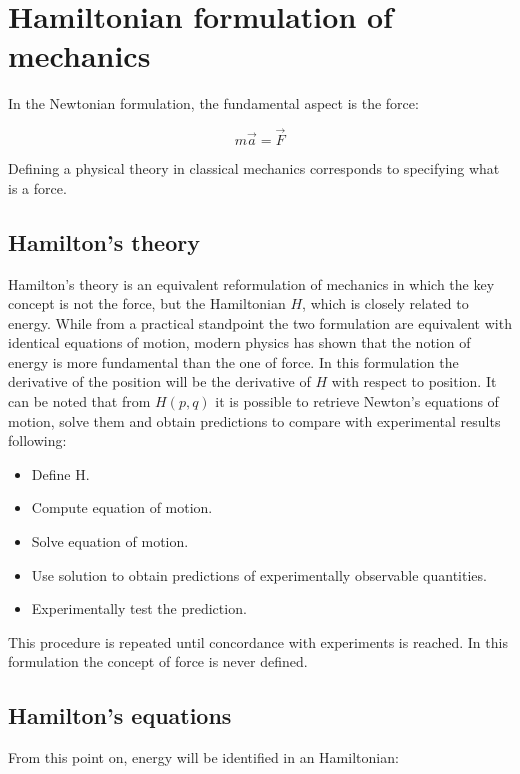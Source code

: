 \section{Hamiltonian formulation of mechanics}
In the Newtonian formulation, the fundamental aspect is the force:

$$m \vec{a} = \vec{F}$$

Defining a physical theory in classical mechanics corresponds to specifying what is a force.

  \subsection{Hamilton's theory}
  Hamilton's theory is an equivalent reformulation of mechanics in which the key concept is not the force, but the Hamiltonian $H$, which is closely related to energy.
  While from a practical standpoint the two formulation are equivalent with identical equations of motion, modern physics has shown that the notion of energy is more fundamental than the one of force.
  In this formulation the derivative of the position will be the derivative of $H$ with respect to position.
  It can be noted that from $H(p,q)$ it is possible to retrieve Newton's equations of motion, solve them and obtain predictions to compare with experimental results following:

  \begin{multicols}{2}
    \begin{itemize}
        \item Define H.
        \item Compute equation of motion.
        \item Solve equation of motion.
        \item Use solution to obtain predictions of experimentally observable quantities.
        \item Experimentally test the prediction.
    \end{itemize}
  \end{multicols}

  This procedure is repeated until concordance with experiments is reached.
  In this formulation the concept of force is never defined.

  \subsection{Hamilton's equations}
  From this point on, energy will be identified in an Hamiltonian:

